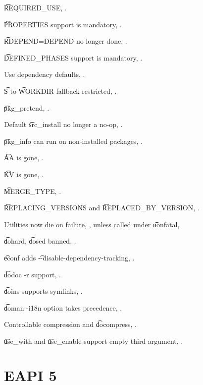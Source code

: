 \begin{compactitem}
\item \t{REQUIRED_USE}, .
\item \t{PROPERTIES} support is mandatory, .
\item \t{RDEPEND=DEPEND} no longer done, .
\item \t{DEFINED_PHASES} support is mandatory, .
\item Use dependency defaults, .
\item \t{S} to \t{WORKDIR} fallback restricted, .
\item \t{pkg_pretend}, .
\item Default \t{src_install} no longer a no-op, .
\item \t{pkg_info} can run on non-installed packages, .
\item \t{AA} is gone, .
\item \t{KV} is gone, .
\item \t{MERGE_TYPE}, .
\item \t{REPLACING_VERSIONS} and \t{REPLACED_BY_VERSION}, .
\item Utilities now die on failure, , unless called under \t{nonfatal},
\item \t{dohard}, \t{dosed} banned, .
\item \t{econf} adds \t{-{}-disable-dependency-tracking}, .
\item \t{dodoc -r} support, .
\item \t{doins} supports symlinks, .
\item \t{doman -i18n} option takes precedence, .
\item Controllable compression and \t{docompress}, .
\item \t{use_with} and \t{use_enable} support empty third argument, .
\end{compactitem}

\section*{EAPI 5}

